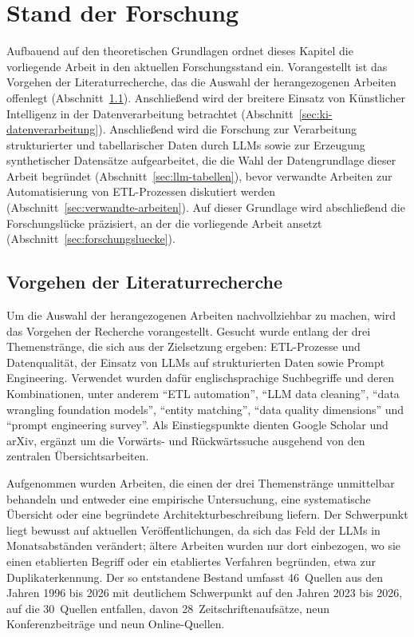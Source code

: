﻿%

\chapter{Stand der Forschung}
\label{ch:stand-der-forschung}

Aufbauend auf den theoretischen Grundlagen ordnet dieses Kapitel die vorliegende Arbeit in den aktuellen Forschungsstand ein. Vorangestellt ist das Vorgehen der Literaturrecherche, das die Auswahl der herangezogenen Arbeiten offenlegt (Abschnitt~\ref{sec:recherche}). Anschließend wird der breitere Einsatz von Künstlicher Intelligenz in der Datenverarbeitung betrachtet (Abschnitt~\ref{sec:ki-datenverarbeitung}). Anschließend wird die Forschung zur Verarbeitung strukturierter und tabellarischer Daten durch \acp{LLM} sowie zur Erzeugung synthetischer Datensätze aufgearbeitet, die die Wahl der Datengrundlage dieser Arbeit begründet (Abschnitt~\ref{sec:llm-tabellen}), bevor verwandte Arbeiten zur Automatisierung von \ac{ETL}-Prozessen diskutiert werden (Abschnitt~\ref{sec:verwandte-arbeiten}). Auf dieser Grundlage wird abschließend die Forschungslücke präzisiert, an der die vorliegende Arbeit ansetzt (Abschnitt~\ref{sec:forschungsluecke}).

\section{Vorgehen der Literaturrecherche}
\label{sec:recherche}

Um die Auswahl der herangezogenen Arbeiten nachvollziehbar zu machen, wird das Vorgehen der Recherche vorangestellt. Gesucht wurde entlang der drei Themenstränge, die sich aus der Zielsetzung ergeben: \ac{ETL}-Prozesse und Datenqualität, der Einsatz von \acp{LLM} auf strukturierten Daten sowie Prompt Engineering. Verwendet wurden dafür englischsprachige Suchbegriffe und deren Kombinationen, unter anderem \enquote{ETL automation}, \enquote{LLM data cleaning}, \enquote{data wrangling foundation models}, \enquote{entity matching}, \enquote{data quality dimensions} und \enquote{prompt engineering survey}.
Als Einstiegspunkte dienten Google Scholar und arXiv, ergänzt um die Vorwärts- und Rückwärtssuche ausgehend von den zentralen Übersichtsarbeiten.

Aufgenommen wurden Arbeiten, die einen der drei Themenstränge unmittelbar behandeln und entweder eine empirische Untersuchung, eine systematische Übersicht oder eine begründete Architekturbeschreibung liefern. Der Schwerpunkt liegt bewusst auf aktuellen Veröffentlichungen, da sich das Feld der \acp{LLM} in Monatsabständen verändert; ältere Arbeiten wurden nur dort einbezogen, wo sie einen etablierten Begriff oder ein etabliertes Verfahren begründen, etwa zur Duplikaterkennung. Der so entstandene Bestand umfasst 46~Quellen aus den Jahren 1996 bis 2026 mit deutlichem Schwerpunkt auf den Jahren 2023 bis 2026, auf die 30~Quellen entfallen, davon 28~Zeitschriftenaufsätze, neun Konferenzbeiträge und neun Online-Quellen.

